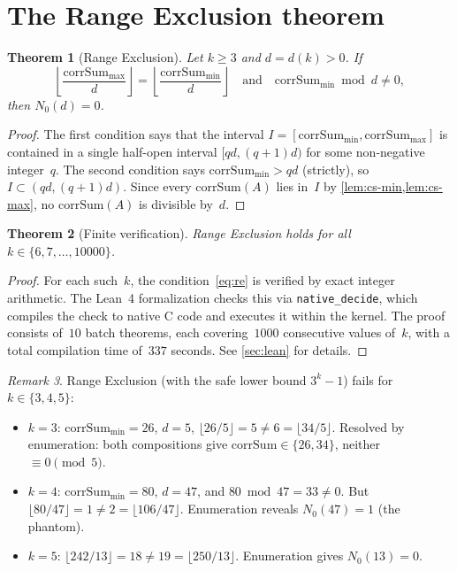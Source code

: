 \documentclass[11pt, a4paper]{amsart}
\theoremstyle{plain}
\newtheorem{theorem}{Theorem}[section]
\theoremstyle{definition}
\theoremstyle{remark}
\newtheorem{remark}[theorem]{Remark}
\newcommand{\corrSum}{\mathrm{corrSum}}
\begin{document}
\section{The Range Exclusion theorem}\label{sec:range-exclusion}

\begin{theorem}[Range Exclusion]\label{thm:re}
  Let $k \geq 3$ and $d = d(k) > 0$.  If
  \begin{equation}\label{eq:re}
    \left\lfloor \frac{\corrSum_{\max}}{d} \right\rfloor
    = \left\lfloor \frac{\corrSum_{\min}}{d} \right\rfloor
    \quad\text{and}\quad
    \corrSum_{\min} \bmod d \neq 0,
  \end{equation}
  then $N_0(d) = 0$.
\end{theorem}

\begin{proof}
  The first condition says that the interval
  $I = [\corrSum_{\min}, \corrSum_{\max}]$ is contained in a
  single half-open interval $[qd, (q{+}1)d)$ for some
  non-negative integer~$q$.  The second condition says
  $\corrSum_{\min} > qd$ (strictly), so
  $I \subset (qd, (q{+}1)d)$.  Since every
  $\corrSum(A)$ lies in~$I$ by
  \cref{lem:cs-min,lem:cs-max}, no $\corrSum(A)$ is
  divisible by~$d$.
\end{proof}

\begin{theorem}[Finite verification]\label{thm:finite}
  Range Exclusion holds for all $k \in \{6, 7, \ldots, 10000\}$.
\end{theorem}

\begin{proof}
  For each such~$k$, the condition~\eqref{eq:re} is
  verified by exact integer arithmetic.  The Lean~4
  formalization checks this via \texttt{native\_decide},
  which compiles the check to native C code and executes
  it within the kernel.  The proof consists of~$10$ batch
  theorems, each covering~$1000$ consecutive values of~$k$,
  with a total compilation time of~$337$ seconds.
  See \cref{sec:lean} for details.
\end{proof}

\begin{remark}\label{rem:small-k}
  Range Exclusion (with the safe lower bound $3^k - 1$) fails
  for $k \in \{3, 4, 5\}$:
  \begin{itemize}
    \item $k = 3$: $\corrSum_{\min} = 26$, $d = 5$,
      $\lfloor 26/5 \rfloor = 5 \neq 6 = \lfloor 34/5 \rfloor$.
      Resolved by enumeration: both compositions give
      $\corrSum \in \{26, 34\}$, neither $\equiv 0 \pmod{5}$.
    \item $k = 4$: $\corrSum_{\min} = 80$, $d = 47$, and
      $80 \bmod 47 = 33 \neq 0$.  But
      $\lfloor 80/47 \rfloor = 1 \neq 2 = \lfloor 106/47 \rfloor$.
      Enumeration reveals $N_0(47) = 1$ (the phantom).
    \item $k = 5$: $\lfloor 242/13 \rfloor = 18 \neq
      19 = \lfloor 250/13 \rfloor$.  Enumeration gives $N_0(13) = 0$.
  \end{itemize}
\end{remark}
\end{document}
